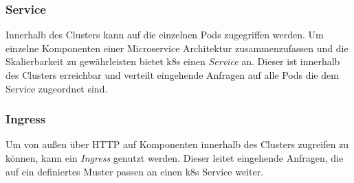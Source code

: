 \subsubsection{Service}
Innerhalb des Clusters kann auf die einzelnen Pods zugegriffen werden.
Um einzelne Komponenten einer Microservice Architektur zusammenzufassen und die Skalierbarkeit zu gewährleisten bietet \ac{k8s} einen \textit{Service} an.
Dieser ist innerhalb des Clusters erreichbar und verteilt eingehende Anfragen auf alle Pods die dem Service zugeordnet sind.

\subsubsection{Ingress}
Um von außen über HTTP auf Komponenten innerhalb des Clusters zugreifen zu können, kann ein \textit{Ingress} genutzt werden.
Dieser leitet eingehende Anfragen, die auf ein definiertes Muster passen an einen \ac{k8s} Service weiter.
